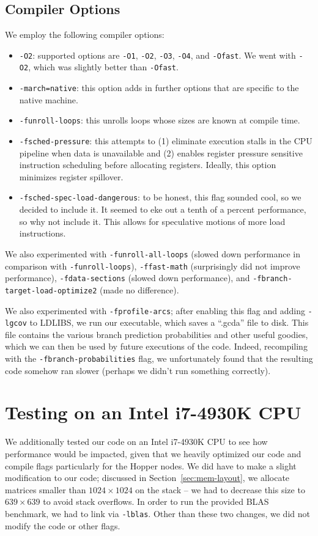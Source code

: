 \documentclass{article} %
\begin{document}
\subsection{Compiler Options}
We employ the following compiler options:
\begin{itemize}
  \item \texttt{-O2}: supported options are \texttt{-O1}, \texttt{-O2},
    \texttt{-O3}, \texttt{-O4}, and \texttt{-Ofast}.
    We went with \texttt{-O2}, which was slightly better than \texttt{-Ofast}.
  \item \texttt{-march=native}: this option adds in further options that are
    specific to the native machine.
  \item \texttt{-funroll-loops}: this unrolls loops whose sizes are known at
    compile time.
  \item \texttt{-fsched-pressure}: this attempts to (1) eliminate execution
    stalls in the CPU pipeline when data is unavailable and (2) enables register
    pressure sensitive instruction scheduling before allocating registers.
    Ideally, this option minimizes register spillover.
  \item \texttt{-fsched-spec-load-dangerous}: to be honest, this flag sounded
    cool, so we decided to include it. It seemed to eke out a tenth of a percent
    performance, so why not include it. This allows for speculative motions of
    more load instructions.
\end{itemize}

We also experimented with \texttt{-funroll-all-loops} (slowed down performance in
comparison with \texttt{-funroll-loops}), \texttt{-ffast-math} (surprisingly
did not improve performance), \texttt{-fdata-sections} (slowed down performance),
and \texttt{-fbranch-target-load-optimize2} (made no difference).

We also experimented with \texttt{-fprofile-arcs}; after enabling this
flag and adding \texttt{-lgcov} to LDLIBS, we run our executable, which saves a
``.gcda'' file to disk. This file contains the various branch prediction
probabilities and other useful goodies, which we can then be used by future
executions of the code. Indeed, recompiling with the
\texttt{-fbranch-probabilities} flag, we unfortunately found that the resulting
code somehow ran slower (perhaps we didn't run something correctly).

\section{Testing on an Intel i7-4930K CPU}
We additionally tested our code on an Intel i7-4930K CPU to see how performance would
be impacted, given that we heavily optimized our code and compile flags particularly
for the Hopper nodes. We did have to make a slight modification to our code; discussed
in Section~\ref{sec:mem-layout}, we allocate matrices smaller than $1024 \times 1024$
on the stack -- we had to decrease this size to $639\times 639$ to avoid stack overflows.
In order to run the provided BLAS benchmark, we had to link via \texttt{-lblas}. Other
than these two changes, we did not modify the code or other flags.
\end{document}
